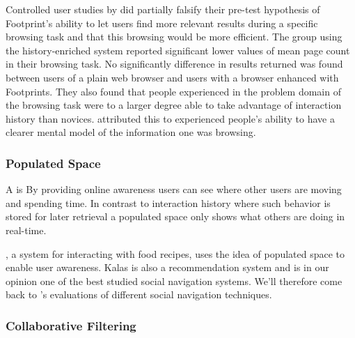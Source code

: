 Controlled user studies by \citeauthor{wexelblat99} did partially falsify
their pre-test hypothesis of Footprint's ability to let users find more
relevant results during a specific browsing task and that this browsing
would be more efficient. The group using the history-enriched system reported
significant lower values of mean page count in their browsing task. No
significantly difference in results returned was found between users of a
plain web browser and users with a browser enhanced with Footprints. They also
found that people experienced in the problem domain of the browsing task were
to a larger degree able to take advantage of interaction history than novices.
\citeauthor{wexelblat99} attributed this to experienced people's ability to
have a clearer mental model of the information one was browsing.


\subsubsection{Populated Space}

A  is
By providing online awareness users can see where other users are moving and
spending time. In contrast to interaction history where such behavior is
stored for later retrieval a populated space only shows what others are doing
in real-time.

 \citep{svensson05}, a system for interacting with food
recipes, uses the idea of populated space to enable user awareness. Kalas is
also a recommendation system and is in our opinion one of the best studied
social navigation systems. We'll therefore come back to
\citeauthor{svensson05}'s evaluations of different social
navigation techniques.

\subsubsection{Collaborative Filtering}
\label{section:background.social.navigation.applied.forms.collaborative.filtering}


